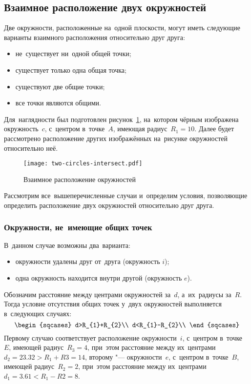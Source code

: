 \documentclass[]{scrartcl}
\begin{document}
\subsection{Взаимное расположение двух окружностей}
Две окружности, расположенные на~одной плоскости, могут иметь следующие варианты взаимного расположения относительно друг друга:
\begin{itemize}
	\item не~существует ни~одной общей точки;
	\item существует только одна общая точка;
	\item существуют две общие точки;
	\item все точки являются общими.
\end{itemize}
Для~наглядности был подготовлен рисунок~\ref{fig:two-circles-intersect}, на~котором чёрным изображена окружность~${\textstyle c}$, с~центром в~точке~${\textstyle A}$, имеющая радиус~${\textstyle R_{1}=10}$. Далее будет рассмотрено расположение других изображённых на~рисунке окружностей относительно неё.
\begin{figure}[ht]
	\centering %
	\texttt{[image: two-circles-intersect.pdf]}
	\caption{Взаимное расположение окружностей}\label{fig:two-circles-intersect}
\end{figure}
Рассмотрим все~вышеперечисленные случаи и~определим условия, позволяющие определить расположение двух окружностей относительно друг друга.
\subsubsection{Окружности, не~имеющие общих точек}
В~данном случае возможны два~варианта:
\begin{itemize}
	\item окружности удалены друг от~друга (окружность ${\textstyle i}$);
	\item одна окружность находится внутри другой (окружность ${\textstyle e}$).
\end{itemize}
Обозначим расстояние между центрами окружностей за~${\textstyle d}$, а~их~радиусы за~${\textstyle R}$. Тогда условие отсутствия общих точек у~двух окружностей выполняется в~следующих случаях:
\begin{equation}\label{eq:two-circles-intersect-zero-points}
	\begin{sqcases}
	d>R_{1}+R_{2}\\
	d<R_{1}-R_{2}\\
	\end{sqcases}
\end{equation}
Первому случаю соответствует расположение окружности~${\textstyle i}$, с~центром в~точке~${\textstyle E}$, имеющей радиус~${\textstyle R_{3}=4}$, при~этом расстояние между их~центрами~${\textstyle d_{2}=23.32>R_{1}+R{3}=14}$, второму "--- окружности~${\textstyle e}$, с~центром в~точке~${\textstyle B}$, имеющей радиус~${\textstyle R_{2}=2}$, при~этом расстояние между их~центрами~${\textstyle d_{1}=3.61<R_{1}-R{2}=8}$.
\end{document}
